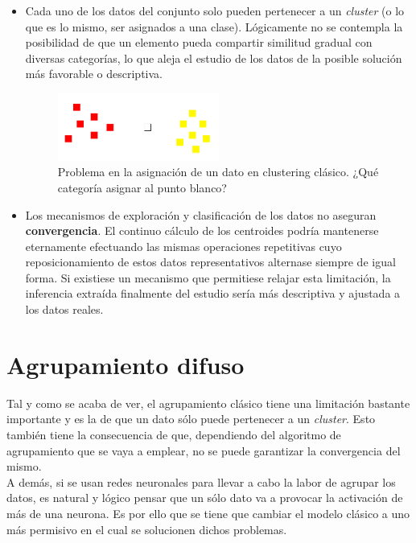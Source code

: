 \documentclass[]{report}
\begin{document}
			\begin{itemize}
				\item Cada uno de los datos del conjunto solo pueden pertenecer a un \textit{cluster} (o lo que es lo mismo, ser asignados a una clase). Lógicamente no se contempla la posibilidad de que un elemento pueda compartir similitud gradual con diversas categorías, lo que aleja el estudio de los datos de la posible solución más favorable o descriptiva.
				
				\begin{figure}[h!]
					\centering
					\includegraphics[width=0.5\textwidth]{Artboard1.jpg}
					\caption{Problema en la asignación de un dato en clustering clásico. ¿Qué categoría asignar al punto blanco?}
					\label{clustering2}
				\end{figure}
			
				\item Los mecanismos de exploración y clasificación de los datos no aseguran \textbf{convergencia}. El continuo cálculo de los centroides podría mantenerse eternamente efectuando las mismas operaciones repetitivas cuyo reposicionamiento de estos datos representativos alternase siempre de igual forma. Si existiese un mecanismo que permitiese relajar esta limitación, la inferencia extraída finalmente del estudio sería más descriptiva y ajustada a los datos reales.
			\end{itemize}
	
	\chapter{Agrupamiento difuso}
		Tal y como se acaba de ver, el agrupamiento clásico tiene una limitación bastante importante y es la de que un dato sólo puede pertenecer a un \textit{cluster}. Esto también tiene la consecuencia de que, dependiendo del algoritmo de agrupamiento que se vaya a emplear, no se puede garantizar la convergencia del mismo.\\
		
		A demás, si se usan redes neuronales para llevar a cabo la labor de agrupar los datos, es natural y lógico pensar que un sólo dato va a provocar la activación de más de una neurona. Es por ello que se tiene que cambiar el modelo clásico a uno más permisivo en el cual se solucionen dichos problemas.
			
\end{document}
